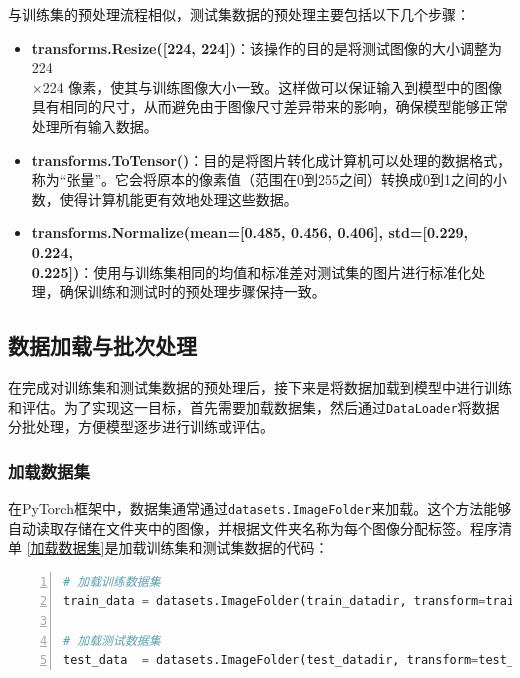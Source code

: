 与训练集的预处理流程相似，测试集数据的预处理主要包括以下几个步骤：

\begin{itemize}
    \item \textbf{transforms.Resize([224, 224])}：该操作的目的是将测试图像的大小调整为224\\ ×224 像素，使其与训练图像大小一致。这样做可以保证输入到模型中的图像具有相同的尺寸，从而避免由于图像尺寸差异带来的影响，确保模型能够正常处理所有输入数据。
    \item \textbf{transforms.ToTensor()}：目的是将图片转化成计算机可以处理的数据格式，称为“张量”。它会将原本的像素值（范围在0到255之间）转换成0到1之间的小数，使得计算机能更有效地处理这些数据。
    \item \textbf{transforms.Normalize(mean=[0.485, 0.456, 0.406], std=[0.229, 0.224, \\0.225])}：使用与训练集相同的均值和标准差对测试集的图片进行标准化处理，确保训练和测试时的预处理步骤保持一致。
\end{itemize}

\subsection{数据加载与批次处理}
在完成对训练集和测试集数据的预处理后，接下来是将数据加载到模型中进行训练和评估。为了实现这一目标，首先需要加载数据集，然后通过\texttt{DataLoader}将数据分批处理，方便模型逐步进行训练或评估。
\subsubsection{加载数据集}

在PyTorch框架中，数据集通常通过\texttt{datasets.ImageFolder}来加载。这个方法能够自动读取存储在文件夹中的图像，并根据文件夹名称为每个图像分配标签。程序清单 \ref{加载数据集}是加载训练集和测试集数据的代码：

\begin{lstlisting}[language={python},label={加载数据集},caption={加载数据集}, basicstyle=\footnotesize\ttfamily, breaklines=true, numbers=left, frame=single,keepspaces=true,showstringspaces=false]
# 加载训练数据集
train_data = datasets.ImageFolder(train_datadir, transform=train_transforms)

# 加载测试数据集
test_data  = datasets.ImageFolder(test_datadir, transform=test_transforms)
\end{lstlisting}

